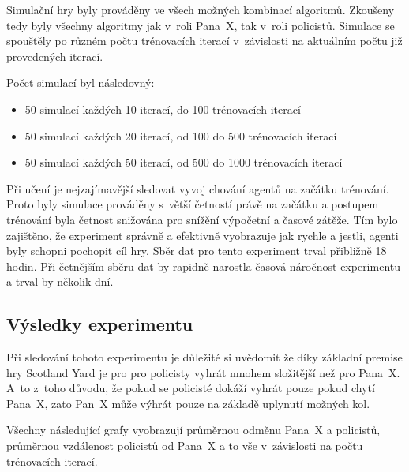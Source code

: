 Simulační hry byly prováděny ve všech možných kombinací algoritmů.
Zkoušeny tedy byly všechny algoritmy jak v~roli Pana~X, tak v~roli policistů.
Simulace se spouštěly po různém počtu trénovacích iterací v~závislosti na aktuálním počtu již provedených iterací.\pagebreak

Počet simulací byl následovný:\vspace{-0.5em}
\begin{itemize}
  \item 50 simulací každých 10 iterací, do 100 trénovacích iterací\vspace{-0.5em}
  \item 50 simulací každých 20 iterací, od 100 do 500 trénovacích iterací\vspace{-0.5em}
  \item 50 simulací každých 50 iterací, od 500 do 1000 trénovacích iterací\vspace{-0.5em}
\end{itemize}

Při učení je nejzajímavější sledovat vyvoj chování agentů na začátku trénování.
Proto byly simulace prováděny s~větší četností právě na začátku a postupem trénování byla četnost snižována pro snížění výpočetní a časové zátěže.
Tím bylo zajištěno, že experiment správně a efektivně vyobrazuje jak rychle a jestli, agenti byly schopni pochopit cíl hry.
Sběr dat pro tento experiment trval přibližně 18 hodin.
Při četnějším sběru dat by rapidně narostla časová náročnost experimentu a trval by několik dní.

\subsection{Výsledky experimentu}
\label{subsec:vysledky-experimentu-1}



Při sledování tohoto experimentu je důležité si uvědomit že díky základní premise hry Scotland Yard je pro pro policisty vyhrát mnohem složitější než pro Pana~X\@.
A~to z~toho důvodu, že pokud se policisté dokáží vyhrát pouze pokud chytí Pana~X, zato Pan~X může výhrát pouze na základě uplynutí možných kol.

Všechny následující grafy vyobrazují průměrnou odměnu Pana~X a policistů, průměrnou vzdálenost policistů od Pana~X a to vše v~závislosti na počtu trénovacích iterací.

